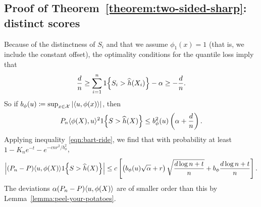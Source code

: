 \documentclass[11pt]{article}
\newcommand{\radphi}{b_{\phi}}
\newcommand{\scorerv}{S}
\begin{document}
\subsection{Proof of Theorem~\ref{theorem:two-sided-sharp}: distinct scores}
\label{sec:proof-two-sided-sharp}

Because of the distinctness of
$\scorerv_i$ and that we assume $\phi_1(x) = 1$ (that is, we include
the constant offset), the optimality conditions for
the quantile loss imply that
\begin{equation*}
  \frac{d}{n} \ge \sum_{i = 1}^n \indic{\scorerv_i > \what{h}(X_i)}
  - \alpha \ge -\frac{d}{n}.
\end{equation*}
So if $\radphi(u) \defeq \sup_{x \in \mc{X}} |\<u, \phi(x)\>|$, then
\begin{equation*}
  P_n\<\phi(X), u\>^2 \indic{\scorerv > \what{h}(X)}
  \le \radphi^2(u) \left(\alpha  + \frac{d}{n} \right).
\end{equation*}
Applying inequality~\eqref{eqn:bart-ride},
we find that with probability at least $1 - K_n e^{-t} - e^{-c n r^2 /
  \radphi^2}$,
\begin{equation*}
  \left|(P_n - P)\<u, \phi(X)\> \indic{\scorerv > \what{h}(X)}\right|
  \le c \left[\left(\radphi(u)\sqrt{\alpha}
    + r\right)\sqrt{\frac{d \log n + t}{n}}
    + \radphi  \frac{d \log n + t}{n}\right].
\end{equation*}
The deviations $\alpha (P_n - P)\langle u, \phi(X)\rangle$ are of smaller
order than this by Lemma~\ref{lemma:peel-your-potatoes}.


\end{document}
